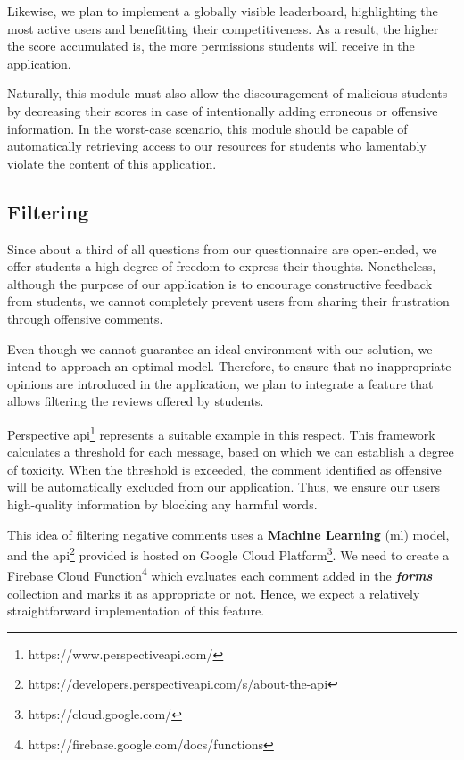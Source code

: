     Likewise, we plan to implement a globally visible leaderboard, highlighting the most active users and benefitting their competitiveness. As a result, the higher the score accumulated is, the more permissions students will receive in the application.
    
    Naturally, this module must also allow the discouragement of malicious students by decreasing their scores in case of intentionally adding erroneous or offensive information. In the worst-case scenario, this module should be capable of automatically retrieving access to our resources for students who lamentably violate the content of this application.
    
    \subsection{Filtering} \label{6:filtering}
    
    Since about a third of all questions from our questionnaire are open-ended, we offer students a high degree of freedom to express their thoughts. Nonetheless, although the purpose of our application is to encourage constructive feedback from students, we cannot completely prevent users from sharing their frustration through offensive comments.
    
    Even though we cannot guarantee an ideal environment with our solution, we intend to approach an optimal model. Therefore, to ensure that no inappropriate opinions are introduced in the application, we plan to integrate a feature that allows filtering the reviews offered by students.
    
    Perspective \acrshort{api}\footnote{https://www.perspectiveapi.com/} represents a suitable example in this respect. This framework calculates a threshold for each message, based on which we can establish a degree of toxicity. When the threshold is exceeded, the comment identified as offensive will be automatically excluded from our application. Thus, we ensure our users high-quality information by blocking any harmful words.
    
    This idea of filtering negative comments uses a \textbf{Machine Learning} (\acrshort{ml}) model, and the \acrshort{api}\footnote{https://developers.perspectiveapi.com/s/about-the-api} provided is hosted on Google Cloud Platform\footnote{https://cloud.google.com/}. We need to create a Firebase Cloud Function\footnote{https://firebase.google.com/docs/functions} which evaluates each comment added in the \textbf{\textit{forms}} collection and marks it as appropriate or not. Hence, we expect a relatively straightforward implementation of this feature.

